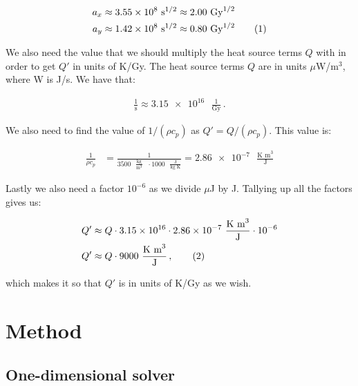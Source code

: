 \documentclass[reprint,english,notitlepage]{revtex4-1}  %
\newcommand\numberthis{\addtocounter{equation}{1}\tag{\theequation}}
\begin{document}
\begin{align*}
a_x &\approx \num{3.55e8} \text{ s}^{1/2} \approx 2.00 \text{ Gy}^{1/2} \\
a_y &\approx \num{1.42e8} \text{ s}^{1/2} \approx 0.80 \text{ Gy}^{1/2} \numberthis \label{eq:parameters_xyscale}
\end{align*}

We also need the value that we should multiply the heat source terms $Q$ with in order to get $Q'$ in units of K/Gy. The heat source terms $Q$ are in units $\mu$W/m$^3$, where W is J/s. We have that:

\begin{align*}
\frac{1}{\text{s}} \approx \num{3.15e16} \text{ }\frac{1}{\text{Gy}} \, .
\end{align*} 

We also need to find the value of $1/(\rho c_p)$ as $Q' = Q/(\rho c_p)$. This value is:

\begin{align*}
\frac{1}{\rho c_p} &= \frac{1}{3500 \text{ } \frac{\text{kg}}{\text{m}^3} \text{ } \cdot 1000 \text{ } \frac{\text{J}}{\text{kg K}}} = \num{2.86e-7} \text{ } \frac{\text{K m}^3}{\text{J}}
\end{align*}

Lastly we also need a factor $10^{-6}$ as we divide $\mu$J by J. Tallying up all the factors gives us:

\begin{align*}
Q' &\approx Q \cdot \num{3.15e16} \cdot \num{2.86e-7} \text{ } \frac{\text{K m}^3}{\text{J}} \cdot 10^{-6} \\
Q' &\approx Q \cdot 9000 \text{ } \frac{\text{K m}^3}{\text{J}} \, , \numberthis \label{eq:parameters_heat_transform}
\end{align*}

which makes it so that $Q'$ is in units of K/Gy as we wish. 







\clearpage

\section{Method} \label{sec:method}

\subsection{One-dimensional solver} \label{sec:method_1D_solver}
\end{document}
